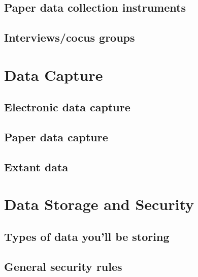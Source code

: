\documentclass[
]{book}
\begin{document}
\hypertarget{paper-data-collection-instruments}{%
\section{Paper data collection instruments}\label{paper-data-collection-instruments}}

\hypertarget{interviewscocus-groups}{%
\section{Interviews/cocus groups}\label{interviewscocus-groups}}

\hypertarget{data-capture}{%
\chapter{Data Capture}\label{data-capture}}

\hypertarget{electronic-data-capture}{%
\section{Electronic data capture}\label{electronic-data-capture}}

\hypertarget{paper-data-capture}{%
\section{Paper data capture}\label{paper-data-capture}}

\hypertarget{extant-data}{%
\section{Extant data}\label{extant-data}}

\hypertarget{data-storage-and-security}{%
\chapter{Data Storage and Security}\label{data-storage-and-security}}

\hypertarget{types-of-data-youll-be-storing}{%
\section{Types of data you'll be storing}\label{types-of-data-youll-be-storing}}

\hypertarget{general-security-rules}{%
\section{General security rules}\label{general-security-rules}}
\end{document}
